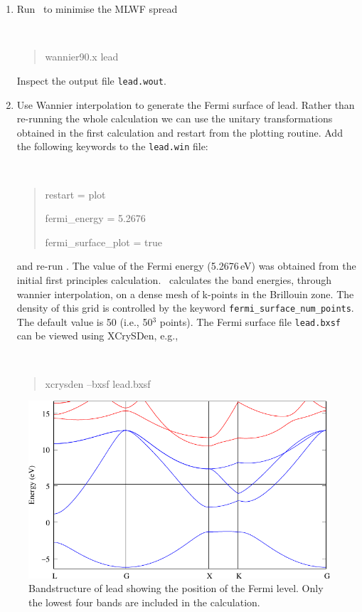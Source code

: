 \documentclass[a4paper,11pt,twoside]{article}
\begin{document}
\begin{enumerate}
\item Run \wannier\ to minimise the MLWF spread
{\tt
\begin{quote}
wannier90.x lead
\end{quote} }
Inspect the output file {\tt lead.wout}.
\item Use Wannier interpolation to generate the Fermi surface of
  lead. Rather than re-running the whole calculation we can use the
  unitary transformations obtained in the first calculation and
  restart from the plotting routine. Add the following keywords to the
  {\tt lead.win} file: {\tt
\begin{quote}
restart = plot

fermi\_energy = 5.2676

fermi\_surface\_plot = true
\end{quote} }
and re-run \wannier. The value of the Fermi energy (5.2676\,eV) was
obtained from the initial first principles calculation. \wannier\
calculates the band energies, through wannier interpolation, on a 
dense mesh of k-points in the Brillouin zone. The density of this grid is
controlled by the keyword {\tt fermi\_surface\_num\_points}. The default
value is 50 (i.e., 50$^3$ points). 
The Fermi surface file {\tt lead.bxsf} can be viewed using XCrySDen,
e.g.,
{\tt
\begin{quote}
xcrysden --bxsf lead.bxsf
\end{quote} }
\end{enumerate}

\begin{figure}[h]
\begin{center}
\includegraphics{lead}
\caption{Bandstructure of lead showing the position of the Fermi
  level. Only the lowest four bands are included in the calculation.} 
\label{fig:pb-bnd}
\end{center}
\end{figure}
\end{document}
